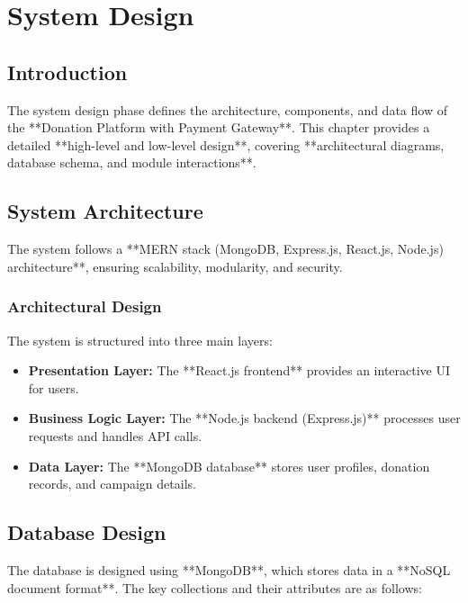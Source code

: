 \chapter{System Design}

\section{Introduction}
The system design phase defines the architecture, components, and data flow of the **Donation Platform with Payment Gateway**. This chapter provides a detailed **high-level and low-level design**, covering **architectural diagrams, database schema, and module interactions**.

\section{System Architecture}
The system follows a **MERN stack (MongoDB, Express.js, React.js, Node.js) architecture**, ensuring scalability, modularity, and security.

\subsection{Architectural Design}
The system is structured into three main layers:
\begin{itemize}
    \item \textbf{Presentation Layer:} The **React.js frontend** provides an interactive UI for users.
    \item \textbf{Business Logic Layer:} The **Node.js backend (Express.js)** processes user requests and handles API calls.
    \item \textbf{Data Layer:} The **MongoDB database** stores user profiles, donation records, and campaign details.
\end{itemize}

\section{Database Design}
The database is designed using **MongoDB**, which stores data in a **NoSQL document format**. The key collections and their attributes are as follows:


